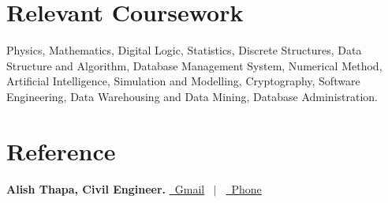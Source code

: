 \documentclass[a4paper,12pt]{article}
\begin{document}
\section{Relevant Coursework}
Physics, Mathematics, Digital Logic, Statistics, Discrete Structures, Data Structure and Algorithm, Database Management System, Numerical Method, Artificial Intelligence, Simulation and Modelling, Cryptography, Software Engineering, Data Warehousing and Data Mining, Database Administration.

%	
\section{Reference}
\textbf{Alish Thapa, Civil Engineer.}  \hfill \href{mailto:alismgr101@gmail.com}{\raisebox{-0.05\height}\faEnvelope \ Gmail} \ $|$ \ 
\href{tel:+9779813545913}{\raisebox{-0.05\height}\faMobile \ Phone}
\end{document}
